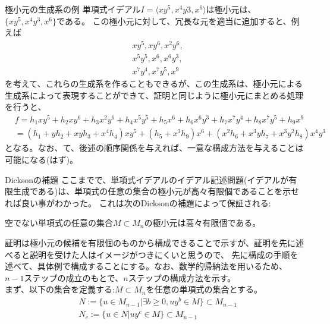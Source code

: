 \begin{frame}
	\begin{exampleblock} {極小元の生成系の例}
		単項式イデアル$I = \langle xy^5, x^4y3, x^6 \rangle$は極小元は、$\{xy^5, x^4y^3, x^6\}$である。
		この極小元に対して、冗長な元を適当に追加すると、例えば
		\begin{align*}
			 & xy^5, xy^6, x^2y^6,  \\
			 & x^5y^5, x^6, x^6y^3, \\
			 & x^7y^4, x^7y^5, x^9
		\end{align*}
		を考えて、これらの生成系を作ることもできるが、この生成系は、極小元による生成系によって表現することができて、証明と同じように極小元にまとめる処理を行うと、
		\begin{align*}
			 & f = h_1 xy^5 + h_2 xy^6 + h_3 x^2y^6 + h_4 x^5y^5 + h_5 x^6 + h_6 x^6y^3 + h_7 x^7y^4 + h_8 x^7 y^5 + h_9 x^9 \\
			 & = (h_1 + yh_2 + xy h_3 + x^4 h_4) xy^5 + (h_5 + x^3 h_9) x^6 + (x^2 h_6 + x^3 y h_7 + x^3y^2 h_8) x^4y^3
		\end{align*}
		となる。なお、て、後述の順序関係を与えれば、一意な構成方法を与えることは可能になる(はず)。
	\end{exampleblock}
\end{frame}

\begin{frame} {Dicksonの補題}
	ここまでで、単項式イデアルのイデアル記述問題(イデアルが有限生成である)は、単項式の任意の集合の極小元が高々有限個であることを示せれば良い事がわかった。
	これは次のDicksonの補題によって保証される:
	\begin{Theorem} [Dicksonの補題]
		\label{thm:dickson}
		空でない単項式の任意の集合$M \subset M_n$の極小元は高々有限個である。
	\end{Theorem}
	証明は極小元の候補を有限個のものから構成できることで示すが、証明を先に述べると説明を受けた人はイメージがつきにくいと思うので、
	先に構成の手順を述べて、具体例で構成することにする。なお、数学的帰納法を用いるため、$n-1$ステップの成立のもとで、$n$ステップの構成方法を示す。\\
	まず、以下の集合を定義する:$M \subset M_n$を任意の単項式の集合とする。
	\begin{align}
		 & N := \{u \in M_{n-1} | \exists b \geq 0, uy^b \in M\} \subset M_{n-1} \\
		 & N_c := \{u \in N | uy^c \in M\} \subset M_{n-1}
	\end{align}
\end{frame}

